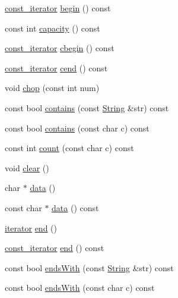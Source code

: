 \begin{DoxyCompactItemize}
\item 
\hyperlink{classprism_1_1_string_a8b46f0fbe9c5c94ba892975242e3ab68}{const\+\_\+iterator} \hyperlink{classprism_1_1_string_ab3b18cfb5a3de6481f2f3d82bf5f0ef6}{begin} () const 
\item 
const int \hyperlink{classprism_1_1_string_a79a0e1b2a185376d36935ff637ba5678}{capacity} () const 
\item 
\hyperlink{classprism_1_1_string_a8b46f0fbe9c5c94ba892975242e3ab68}{const\+\_\+iterator} \hyperlink{classprism_1_1_string_a75949922d27570e2e10bb9b48c12040b}{cbegin} () const 
\item 
\hyperlink{classprism_1_1_string_a8b46f0fbe9c5c94ba892975242e3ab68}{const\+\_\+iterator} \hyperlink{classprism_1_1_string_a4581fe1b0f09c49753d8a9f5ddbba4ce}{cend} () const 
\item 
void \hyperlink{classprism_1_1_string_a6a0006f4412961eab5625d6366f60137}{chop} (const int num)
\item 
const bool \hyperlink{classprism_1_1_string_a6c449b65e60b931cbb9c951e442f1153}{contains} (const \hyperlink{classprism_1_1_string}{String} \&str) const 
\item 
const bool \hyperlink{classprism_1_1_string_ade50c4d728c1d7dfce7713a9c48e4033}{contains} (const char c) const 
\item 
const int \hyperlink{classprism_1_1_string_adde5ee34a762ec89df4354f562cb4c39}{count} (const char c) const 
\item 
void \hyperlink{classprism_1_1_string_adcfa3f36badcb9e84c2c956a6b29c865}{clear} ()
\item 
char $\ast$ \hyperlink{classprism_1_1_string_aa70973a523fcfbaa608645085f004d29}{data} ()
\item 
const char $\ast$ \hyperlink{classprism_1_1_string_a8f28ba12d030e7f28fe533901dad97ea}{data} () const 
\item 
\hyperlink{classprism_1_1_string_adacc7975837e5fff95d70690777fb330}{iterator} \hyperlink{classprism_1_1_string_a66cac7d74458715877d381c036bd1698}{end} ()
\item 
\hyperlink{classprism_1_1_string_a8b46f0fbe9c5c94ba892975242e3ab68}{const\+\_\+iterator} \hyperlink{classprism_1_1_string_ada5833ed658db9ed7cd0d847b727b1c3}{end} () const 
\item 
const bool \hyperlink{classprism_1_1_string_a3cfa97542dcbb79a4db5715dcde850a5}{ends\+With} (const \hyperlink{classprism_1_1_string}{String} \&str) const 
\item 
const bool \hyperlink{classprism_1_1_string_aa478bddcdb9ea30ba0a8d1389296607c}{ends\+With} (const char c) const 

\end{DoxyCompactItemize}
